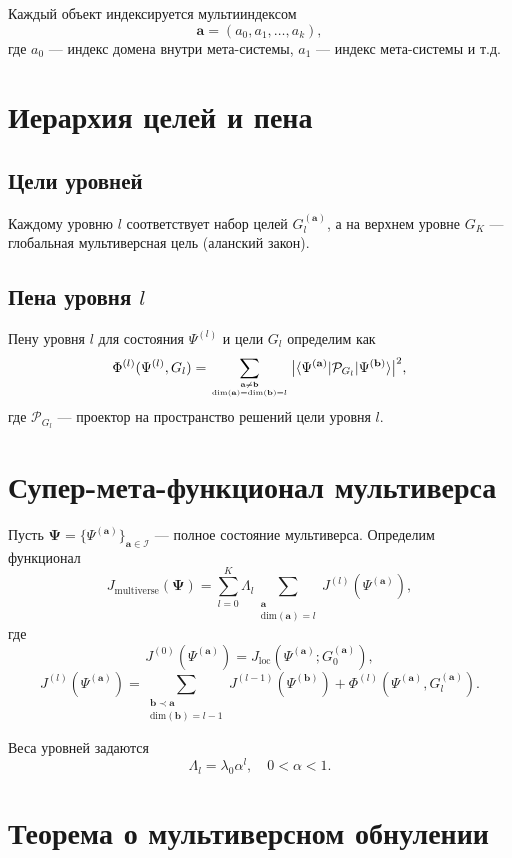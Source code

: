 \documentclass[12pt,a4paper]{article}
\theoremstyle{plain}
\begin{document}
Каждый объект индексируется мультииндексом
\[
\mathbf{a} = (a_0,a_1,\dots,a_k),
\]
где $a_0$ — индекс домена внутри мета-системы, $a_1$ — индекс мета-системы и т.д.

\section{Иерархия целей и пена}

\subsection{Цели уровней}

Каждому уровню $l$ соответствует набор целей $G_l^{(\mathbf{a})}$, а на верхнем уровне $G_K$ — глобальная мультиверсная цель (аланский закон).

\subsection{Пена уровня $l$}

Пену уровня $l$ для состояния $\Psi^{(l)}$ и цели $G_l$ определим как
\[
\Phi^{(l)}(\Psi^{(l)},G_l)
= \sum_{\mathbf{a}\neq\mathbf{b} \atop \text{dim}(\mathbf{a})=\text{dim}(\mathbf{b})=l}
\big|\langle \Psi^{(\mathbf{a})} | \mathcal{P}_{G_l} | \Psi^{(\mathbf{b})} \rangle \big|^2,
\]
где $\mathcal{P}_{G_l}$ — проектор на пространство решений цели уровня $l$.

\section{Супер-мета-функционал мультиверса}

Пусть $\mathbf{\Psi} = \{\Psi^{(\mathbf{a})}\}_{\mathbf{a}\in\mathcal{I}}$ — полное состояние мультиверса.
Определим функционал
\[
J_{\text{multiverse}}(\mathbf{\Psi})
= \sum_{l=0}^K \Lambda_l
  \sum_{\substack{\mathbf{a}\\ \text{dim}(\mathbf{a})=l}}
  J^{(l)}(\Psi^{(\mathbf{a})}),
\]
где
\[
J^{(0)}(\Psi^{(\mathbf{a})})
= J_{\text{loc}}(\Psi^{(\mathbf{a})};G_0^{(\mathbf{a})}),
\]
\[
J^{(l)}(\Psi^{(\mathbf{a})})
= \sum_{\substack{\mathbf{b}\prec\mathbf{a}\\ \text{dim}(\mathbf{b})=l-1}}
  J^{(l-1)}(\Psi^{(\mathbf{b})})
  + \Phi^{(l)}(\Psi^{(\mathbf{a})},G_l^{(\mathbf{a})}).
\]

Веса уровней задаются
\[
\Lambda_l = \lambda_0 \alpha^l,\quad 0<\alpha<1.
\]

\section{Теорема о мультиверсном обнулении}
\end{document}

